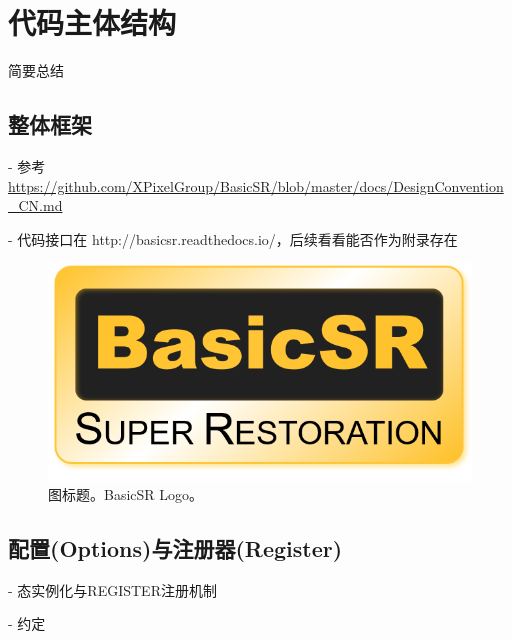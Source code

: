 \documentclass[../main.tex]{subfiles}
\begin{document}
\chapter{代码主体结构}
\vspace{-2cm}

简要总结

\section{整体框架}

- 参考 \url{https://github.com/XPixelGroup/BasicSR/blob/master/docs/DesignConvention_CN.md}

- 代码接口在 http://basicsr.readthedocs.io/，后续看看能否作为附录存在

\begin{figure}[t]
	\begin{center}
		\includegraphics[width=\linewidth]{figures/basicsr_logo.png}
		\vspace{-1cm}
		\caption{图标题。BasicSR Logo。}
		\label{fig:logo}
	\end{center}
\end{figure}

\section{配置(Options)与注册器(Register)}

- 态实例化与REGISTER注册机制

- 约定
\end{document}
